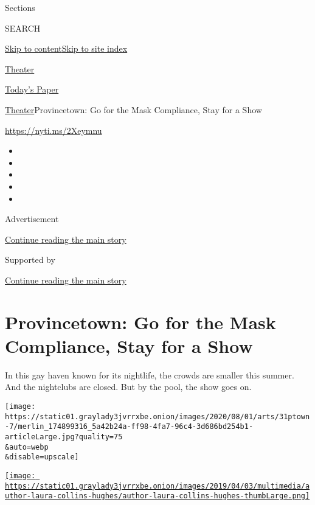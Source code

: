 Sections

SEARCH

\protect\hyperlink{site-content}{Skip to
content}\protect\hyperlink{site-index}{Skip to site index}

\href{https://www.nytimes3xbfgragh.onion/section/theater}{Theater}

\href{https://myaccount.nytimes3xbfgragh.onion/auth/login?response_type=cookie\&client_id=vi}{}

\href{https://www.nytimes3xbfgragh.onion/section/todayspaper}{Today's
Paper}

\href{/section/theater}{Theater}\textbar{}Provincetown: Go for the Mask
Compliance, Stay for a Show

\url{https://nyti.ms/2Xeymnu}

\begin{itemize}
\item
\item
\item
\item
\item
\end{itemize}

Advertisement

\protect\hyperlink{after-top}{Continue reading the main story}

Supported by

\protect\hyperlink{after-sponsor}{Continue reading the main story}

\hypertarget{provincetown-go-for-the-mask-compliance-stay-for-a-show}{%
\section{Provincetown: Go for the Mask Compliance, Stay for a
Show}\label{provincetown-go-for-the-mask-compliance-stay-for-a-show}}

In this gay haven known for its nightlife, the crowds are smaller this
summer. And the nightclubs are closed. But by the pool, the show goes
on.

\texttt{[image: https://static01.graylady3jvrrxbe.onion/images/2020/08/01/arts/31ptown-7/merlin\_174899316\_5a42b24a-ff98-4fa7-96c4-3d686bd254b1-articleLarge.jpg?quality=75\\\&auto=webp\\\&disable=upscale]}

\href{https://www.nytimes3xbfgragh.onion/by/laura-collins-hughes}{\texttt{[image: https://static01.graylady3jvrrxbe.onion/images/2019/04/03/multimedia/author-laura-collins-hughes/author-laura-collins-hughes-thumbLarge.png]}}

